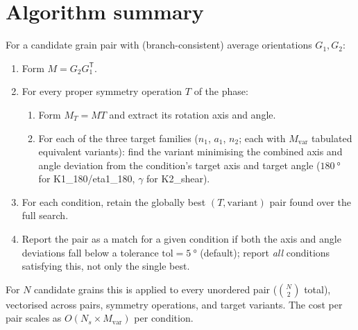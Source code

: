 \documentclass[11pt]{article}
\begin{document}
\section{Algorithm summary}

For a candidate grain pair with (branch-consistent) average orientations
$G_1, G_2$:
\begin{enumerate}
  \item Form $M = G_2 G_1^{\mathsf T}$.
  \item For every proper symmetry operation $T$ of the phase:
  \begin{enumerate}
    \item Form $M_T = M T$ and extract its rotation axis and angle.
    \item For each of the three target families ($n_1$, $a_1$, $n_2$;
      each with $M_{\text{var}}$ tabulated equivalent variants): find
      the variant minimising the combined axis and angle deviation from
      the condition's target axis and target angle
      ($\SI{180}{\degree}$ for K1\_180/eta1\_180, $\gamma$ for K2\_shear).
  \end{enumerate}
  \item For each condition, retain the globally best $(T, \text{variant})$
    pair found over the full search.
  \item Report the pair as a match for a given condition if both the
    axis and angle deviations fall below a tolerance
    $\text{tol}=\SI{5}{\degree}$ (default); report \emph{all} conditions
    satisfying this, not only the single best.
\end{enumerate}

For $N$ candidate grains this is applied to every unordered pair
($\binom{N}{2}$ total), vectorised across pairs, symmetry operations, and
target variants. The cost per pair scales as $O(N_s \times
M_{\text{var}})$ per condition.
\end{document}
